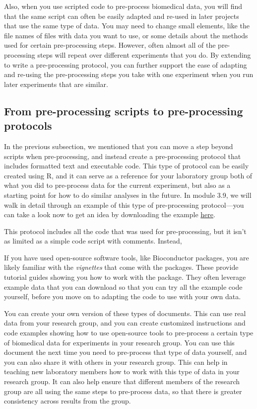 \documentclass[]{tufte-book}
\begin{document}
Also, when you use scripted code to pre-process biomedical data, you will find
that the same script can often be easily adapted and re-used in later projects
that use the same type of data. You may need to change small elements, like the
file names of files with data you want to use, or some details about the methods
used for certain pre-processing steps. However, often almost all of the
pre-processing steps will repeat over different experiments that you do. By
extending to write a pre-processing protocol, you can further support the
ease of adapting and re-using the pre-processing steps you take with one
experiment when you run later experiments that are similar.

\hypertarget{from-pre-processing-scripts-to-pre-processing-protocols}{%
\subsection{From pre-processing scripts to pre-processing protocols}\label{from-pre-processing-scripts-to-pre-processing-protocols}}

In the previous subsection, we mentioned that you can move a step beyond scripts
when pre-processing, and instead create a pre-processing protocol that includes
formatted text and executable code. This type of protocol can be easily created
using R, and it can serve as a reference for your laboratory group both of what
you did to pre-process data for the current experiment, but also as a starting
point for how to do similar analyses in the future. In module 3.9, we will walk
in detail through an example of this type of pre-processing protocol---you can
take a look now to get an idea by downloading the example
\href{https://github.com/geanders/improve_repro/raw/master/data/bactcountr_example_data/example_protocol.pdf}{here}.

This protocol includes all the code that was used for pre-processing, but it
isn't as limited as a simple code script with comments. Instead,

If you have used open-source software tools, like Bioconductor packages, you
are likely familiar with the \emph{vignettes} that come with the packages. These
provide tutorial guides showing you how to work with the package. They often
leverage example data that you can download so that you can try all the
example code yourself, before you move on to adapting the code to use with
your own data.

You can create your own version of these types of documents. This can use
real data from your research group, and you can create customized instructions
and code examples showing how to use open-source tools to pre-process a
certain type of biomedical data for experiments in your research group.
You can use this document the next time you need to pre-process that type
of data yourself, and you can also share it with others in your research
group. This can help in teaching new laboratory members how to work with
this type of data in your research group. It can also help ensure that
different members of the research group are all using the same steps to
pre-process data, so that there is greater consistency across results from
the group.
\end{document}
